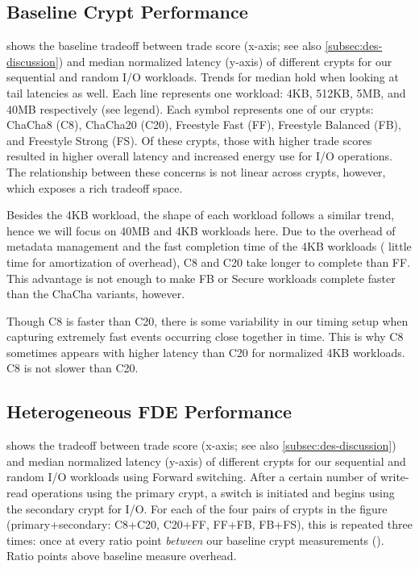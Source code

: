 \subsection{Baseline Crypt Performance}\label{subsec:eval-baseline}



 shows the baseline tradeoff between trade score
(x-axis; see also \cref{subsec:des-discussion}) and median normalized latency
(y-axis) of different crypts for our sequential and random I/O workloads. Trends
for median hold when looking at tail latencies as well. Each line represents one
workload: 4KB, 512KB, 5MB, and 40MB respectively (see legend). Each symbol
represents one of our crypts: ChaCha8 (C8), ChaCha20 (C20), Freestyle Fast (FF),
Freestyle Balanced (FB), and Freestyle Strong (FS). Of these crypts, those with
higher trade scores resulted in higher overall latency and increased energy use
for I/O operations. The relationship between these concerns is not linear across
crypts, however, which exposes a rich tradeoff space.

Besides the 4KB workload, the shape of each workload follows a similar trend,
hence we will focus on 40MB and 4KB workloads here. Due to the overhead of
metadata management and the fast completion time of the 4KB workloads (\ie
little time for amortization of overhead), C8 and C20 take longer to complete
than FF. This advantage is not enough to make FB or Secure workloads complete
faster than the ChaCha variants, however.

Though C8 is faster than C20, there is some variability in our timing setup when
capturing extremely fast events occurring close together in time. This is why C8
sometimes appears with higher latency than C20 for normalized 4KB workloads. C8
is not slower than C20.


\subsection{Heterogeneous FDE Performance}\label{subsec:eval-flexible}



 shows the tradeoff between trade score (x-axis; see also
\cref{subsec:des-discussion}) and median normalized latency (y-axis) of
different crypts for our sequential and random I/O workloads using Forward
switching. After a certain number of write-read operations using the primary
crypt, a switch is initiated and \sys begins using the secondary crypt for I/O.
For each of the four pairs of crypts in the figure (primary+secondary: C8+C20,
C20+FF, FF+FB, FB+FS), this is repeated three times: once at every ratio point
{\em between} our baseline crypt measurements (). Ratio points above baseline measure overhead.

